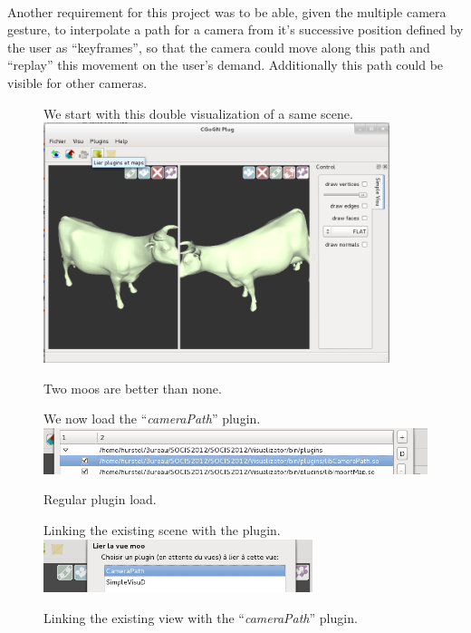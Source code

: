 \documentclass[a4paper]{scrreprt}
\begin{document}
	\paragraph{}
	Another requirement for this project was to be able, given the multiple camera
	gesture, to interpolate a path for a camera from it's successive position
	defined by the user as ``keyframes'', so that the camera could move along this
	path and ``replay'' this movement on the user's demand. Additionally this path
	could be visible for other cameras.
	\begin{figure}[h!p]
		We start with this double visualization of a same scene.\\
		\centering
		\includegraphics[width=0.9\textwidth]{images/screenshot19}
		\caption{Two moos are better than none.}
	\end{figure}
	\begin{figure}[h!p]
		We now load the ``\textit{cameraPath}'' plugin.\\
		\centering
		\includegraphics[width=1.0\textwidth]{images/screenshot20}
		\caption{Regular plugin load.}		
	\end{figure}
	\begin{figure}[h!p]
		Linking the existing scene with the plugin.\\
		\centering
		\includegraphics[width=0.7\textwidth]{images/screenshot21}
		\caption{Linking the existing view with the ``\textit{cameraPath}'' plugin.}		
	\end{figure}
\end{document}
